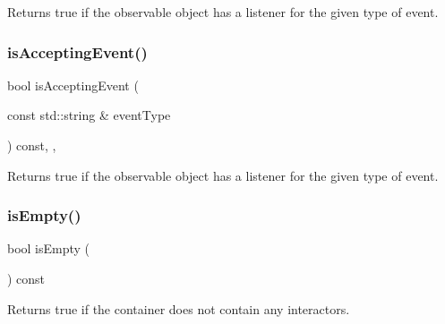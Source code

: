 Returns true if the observable object has a listener for the given type of event. 

\mbox{\label{classsgl_1_1GObservable_a3b1c689267eda44e65a2213e7de38b23}} 
\subsubsection{\texorpdfstring{is\+Accepting\+Event()}{isAcceptingEvent()}\hspace{0.1cm}{\footnotesize\ttfamily [3/3]}}
{\footnotesize\ttfamily bool is\+Accepting\+Event (\begin{DoxyParamCaption}\item[{const std\+::string \&}]{event\+Type }\end{DoxyParamCaption}) const\hspace{0.3cm}{\ttfamily [protected]}, {\ttfamily [virtual]}, {\ttfamily [inherited]}}



Returns true if the observable object has a listener for the given type of event. 

\mbox{\label{classsgl_1_1GContainer_acf82f9b2937375c7b1cf3dccb3df3312}} 
\subsubsection{\texorpdfstring{is\+Empty()}{isEmpty()}}
{\footnotesize\ttfamily bool is\+Empty (\begin{DoxyParamCaption}{ }\end{DoxyParamCaption}) const\hspace{0.3cm}{\ttfamily [virtual]}}



Returns true if the container does not contain any interactors. 

\mbox{\label{classsgl_1_1GInteractor_aacb819fb241851fd9fc045271baa4034}} 

